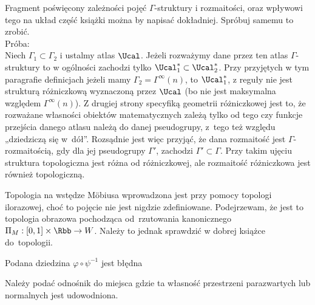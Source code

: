 \documentclass[a4paper,11pt]{article}
\numberwithin{equation}{section}
\begin{document}
\noindent
Fragment poświęcony zależności pojęć $\Gamma$-struktury i rozmaitości,
oraz wpływowi tego na układ część książki można by napisać dokładniej.
Spróbuj samemu to zrobić. \\
Próba: \\
Niech $\Gamma_{ 1 } \subset \Gamma_{ 2 }$ i ustalmy atlas
$\Ucal$. Jeżeli rozważymy dane przez ten atlas
$\Gamma$-struktury to w ogólności zachodzi tylko
$\Ucal^{ * }_{ 1 } \subset \Ucal^{ * }_{ 2 }$. Przy
przyjętych w tym paragrafie definicjach jeżeli mamy
$\Gamma_{ 2 } = \Gamma^{ \infty }( n )$, to
$\Ucal^{ * }_{ 1 }$, z reguły nie jest strukturą różniczkową
wyznaczoną przez $\Ucal$ (bo nie jest maksymalna względem
$\Gamma^{ \infty }( n )$). Z drugiej strony specyfiką geometrii
różniczkowej jest to, że rozważane własności obiektów matematycznych
zależą tylko od tego czy funkcje przejścia danego atlasu należą do
danej pseudogrupy, z~tego też względu „dziedziczą się w~dół”.
Rozsądnie jest więc przyjąć, że dana rozmaitość jest
$\Gamma$-rozmaitością, gdy dla jej pseudogrupy $\Gamma'$, zachodzi
$\Gamma' \subset \Gamma$. Przy takim ujęciu struktura topologiczna
jest różna od różniczkowej, ale rozmaitość różniczkowa
jest również topologiczną.

\vspace{\spaceFour}





\noindent
{} Topologia na wstędze M\"{o}biusa wprowadzona jest przy pomocy
topologi ilorazowej, choć to pojęcie nie jest nigdzie zdefiniowane.
Podejrzewam, że jest to topologia obrazowa pochodząca od~rzutowania
kanonicznego $\Pi_{ M } : [ 0,1 ] \times \Rbb \to W$. Należy to jednak
sprawdzić w dobrej książce do~topologii.

\vspace{\spaceFour}





\noindent
{} Podana dziedzina $\varphi \circ \psi^{ -1 }$ jest błędna 

\vspace{\spaceFour}





\noindent
{} Należy podać odnośnik do miejsca gdzie ta własność przestrzeni
parazwartych lub normalnych jest udowodniona.

\vspace{\spaceFour}
\end{document}
